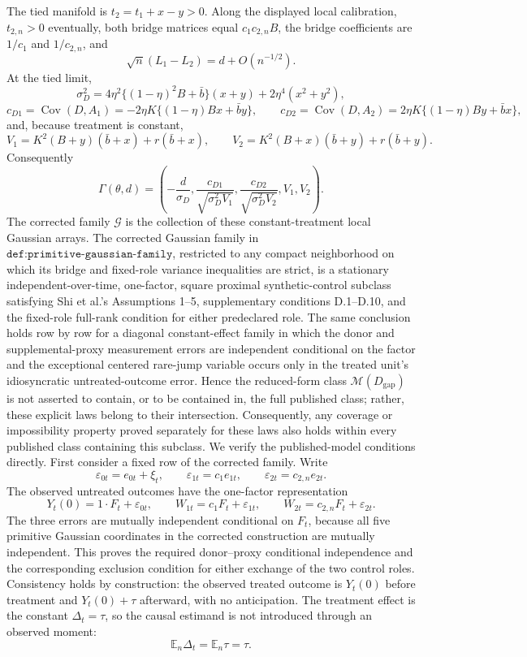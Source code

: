 The tied manifold is \(t_2=t_1+x-y>0\).  Along the displayed local calibration, \(t_{2,n}>0\) eventually, both bridge matrices equal \(c_1c_{2,n}B\), the bridge coefficients are \(1/c_1\) and \(1/c_{2,n}\), and
\[
 \sqrt n(L_1-L_2)=d+O(n^{-1/2}).
\]
At the tied limit,
\[
 \sigma_D^2
 =4\eta^2\{(1-\eta)^2B+\bar b\}(x+y)
  +2\eta^4(x^2+y^2),
\]
\[
 c_{D1}=\operatorname{Cov}(D,A_1)
 =-2\eta K\{(1-\eta)Bx+\bar b y\},
\qquad
 c_{D2}=\operatorname{Cov}(D,A_2)
 =2\eta K\{(1-\eta)By+\bar b x\},
\]
and, because treatment is constant,
\[
 V_1=K^2(B+y)(\bar b+x)+r(\bar b+x),
\qquad
 V_2=K^2(B+x)(\bar b+y)+r(\bar b+y).
\]
Consequently
\[
 \Gamma(\theta,d)
 =\left(
 -\frac d{\sigma_D},
 \frac{c_{D1}}{\sqrt{\sigma_D^2V_1}},
 \frac{c_{D2}}{\sqrt{\sigma_D^2V_2}},
 V_1,V_2
 \right).
\]
The corrected family \(\mathcal G\) is the collection of these constant-treatment local Gaussian arrays.
The corrected Gaussian family in \(\texttt{def:primitive-gaussian-family}\), restricted to any compact neighborhood on which its bridge and fixed-role variance inequalities are strict, is a stationary independent-over-time, one-factor, square proximal synthetic-control subclass satisfying Shi et al.'s Assumptions 1--5, supplementary conditions D.1--D.10, and the fixed-role full-rank condition for either predeclared role.  The same conclusion holds row by row for a diagonal constant-effect family in which the donor and supplemental-proxy measurement errors are independent conditional on the factor and the exceptional centered rare-jump variable occurs only in the treated unit's idiosyncratic untreated-outcome error.  Hence the reduced-form class \(\mathcal M(D_{\mathrm{gap}})\) is not asserted to contain, or to be contained in, the full published class; rather, these explicit laws belong to their intersection.  Consequently, any coverage or impossibility property proved separately for these laws also holds within every published class containing this subclass.
We verify the published-model conditions directly.  First consider a fixed row of the corrected family.  Write
\[
 \varepsilon_{0t}=e_{0t}+\xi_t,\qquad
 \varepsilon_{1t}=c_1e_{1t},\qquad
 \varepsilon_{2t}=c_{2,n}e_{2t}.
\]
The observed untreated outcomes have the one-factor representation
\[
 Y_t(0)=1\cdot F_t+\varepsilon_{0t},\qquad
 W_{1t}=c_1F_t+\varepsilon_{1t},\qquad
 W_{2t}=c_{2,n}F_t+\varepsilon_{2t}.
\]
The three errors are mutually independent conditional on \(F_t\), because all five primitive Gaussian coordinates in the corrected construction are mutually independent.  This proves the required donor--proxy conditional independence and the corresponding exclusion condition for either exchange of the two control roles.  Consistency holds by construction: the observed treated outcome is \(Y_t(0)\) before treatment and \(Y_t(0)+\tau\) afterward, with no anticipation.  The treatment effect is the constant \(\Delta_t=\tau\), so the causal estimand is not introduced through an observed moment:
\[
 \mathbb E_n\Delta_t=\mathbb E_n\tau=\tau.
\]

